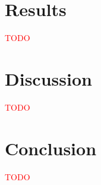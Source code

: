\documentclass[11pt,a4paper]{article}
\begin{document}

\section{Results}

\textcolor{Red}{TODO}


\section{Discussion}

\textcolor{Red}{TODO}


\section{Conclusion}

\textcolor{Red}{TODO}






\clearpage
\end{document}
